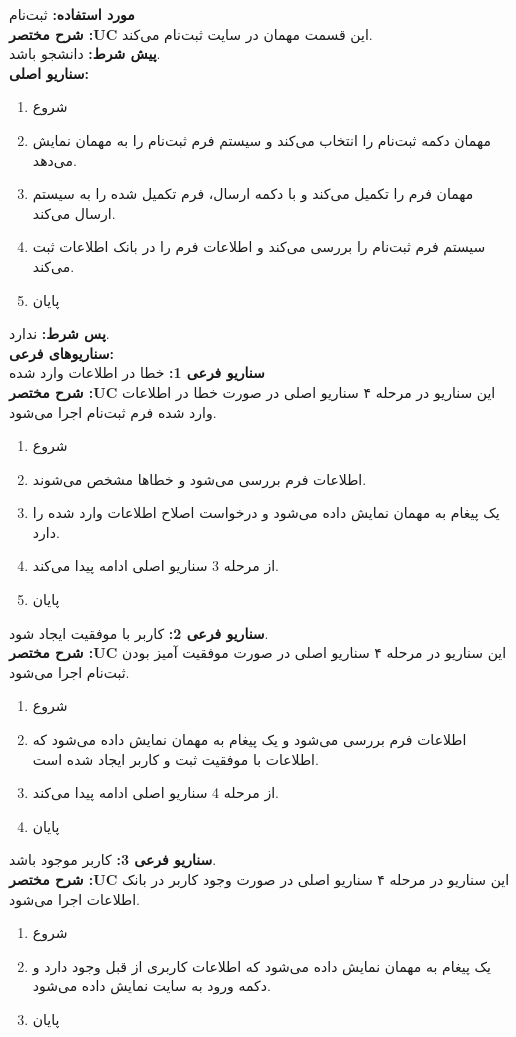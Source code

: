 
\textbf{مورد استفاده:}
ثبت‌نام
\\
\textbf{شرح مختصر :UC}
این قسمت مهمان در سایت ثبت‌نام می‌کند.
\\
\textbf{پيش شرط:}
 دانشجو باشد.
\\
\textbf{سناريو اصلی:}
\begin{enumerate}
\item
شروع
\item
مهمان دکمه ثبت‌نام را انتخاب می‌کند و سیستم فرم ثبت‌نام را به مهمان نمایش می‌دهد.
\item
مهمان فرم را تکمیل می‌کند و با دکمه ارسال، فرم تکمیل شده را به سیستم ارسال می‌کند.
\item
سیستم فرم ثبت‌نام را بررسی می‌کند و اطلاعات فرم را در بانک اطلاعات ثبت می‌کند.
\item
پایان
\end{enumerate}

\noindent
\textbf{پس شرط:}
ندارد.
\\
\textbf{سناريوهای فرعی:}
\\
\textbf{سناريو فرعی 1:}
خطا در اطلاعات وارد شده
\\
\textbf{شرح مختصر :UC}
این سناریو در مرحله ۴ سناریو اصلی در صورت خطا در اطلاعات وارد شده فرم ثبت‌نام اجرا می‌شود.
\begin{enumerate}
\item
شروع
\item
اطلاعات فرم بررسی می‌شود و خطاها مشخص می‌شوند.
\item
یک پیغام به مهمان نمایش داده می‌شود و درخواست اصلاح اطلاعات وارد شده را دارد.
\item
از مرحله 3 سناریو اصلی ادامه پیدا می‌کند.
\item
پایان
\end{enumerate}

\noindent
\textbf{سناريو فرعی 2:}
کاربر با موفقیت ایجاد شود.
\\
\textbf{شرح مختصر :UC}
این سناریو در مرحله ۴ سناریو اصلی در صورت موفقیت آمیز بودن ثبت‌نام اجرا می‌شود.
\begin{enumerate}
\item
شروع
\item
اطلاعات فرم بررسی می‌شود و یک پیغام به مهمان نمایش داده می‌شود که اطلاعات با موفقیت ثبت و کاربر ایجاد شده است.
\item
از مرحله 4 سناریو اصلی ادامه پیدا می‌کند.
\item
پایان
\end{enumerate}

\noindent
\textbf{سناريو فرعی 3:}
کاربر موجود باشد.
\\
\textbf{شرح مختصر :UC}
این سناریو در مرحله ۴ سناریو اصلی در صورت وجود کاربر در بانک اطلاعات اجرا می‌شود.
\begin{enumerate}
\item
شروع
\item
یک پیغام به مهمان نمایش داده می‌شود که اطلاعات کاربری از قبل وجود دارد و دکمه ورود به سایت نمایش داده می‌شود.
\item
پایان
\end{enumerate}

